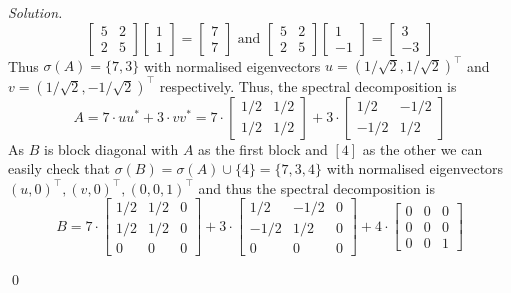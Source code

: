 \documentclass[12pt,a4paper]{article}
\newenvironment{solution}{%
  \par\noindent\textit{Solution.}\ }{\qed}
\theoremstyle{problemstyle}
\begin{document}
\begin{solution}
    \[
     	\begin{bmatrix}
			5 & 2\\ 2 & 5
     	\end{bmatrix}
     	\begin{bmatrix}
			1\\ 1
     	\end{bmatrix}
		= \begin{bmatrix}
		    7\\ 7
		\end{bmatrix}
		\text{ and }
		\begin{bmatrix}
			5 & 2\\ 2 & 5
     	\end{bmatrix}
     	\begin{bmatrix}
			1\\ -1
     	\end{bmatrix}
		= \begin{bmatrix}
		    3\\ -3
		\end{bmatrix}
    \]
	Thus $\sigma(A)=\{7,3\}$ with normalised eigenvectors $u=(1/\sqrt{2},1/\sqrt{2})^\top$ and $v=(1/\sqrt{2},-1/\sqrt{2})^\top$ respectively. Thus, the spectral decomposition is
	\[
	    A=7\cdot uu^*+3\cdot vv^*=7\cdot \begin{bmatrix}
			1/2 & 1/2\\
			1/2 & 1/2
	    \end{bmatrix}+3\cdot\begin{bmatrix}
			1/2 & -1/2\\
			-1/2 & 1/2
	    \end{bmatrix}
	\]
	As $B$ is block diagonal with $A$ as the first block and $[4]$ as the other we can easily check that $\sigma(B)=\sigma(A)\cup\{4\}=\{7,3,4\}$ with normalised eigenvectors $(u,0)^\top,(v,0)^\top,(0,0,1)^\top$ and thus the spectral decomposition is
	\[
	    B=7\cdot \begin{bmatrix}
			1/2 & 1/2 & 0\\ 1/2 & 1/2 & 0\\ 0 & 0 & 0
	    \end{bmatrix} + 3\cdot \begin{bmatrix}
			1/2 & -1/2 & 0\\ -1/2 & 1/2 & 0\\ 0 & 0 & 0
	    \end{bmatrix} + 4\cdot \begin{bmatrix}
			0 & 0 & 0\\
			0 & 0 & 0\\
			0 & 0 & 1
	    \end{bmatrix} 
	\]
	
\end{solution}
\end{document}
